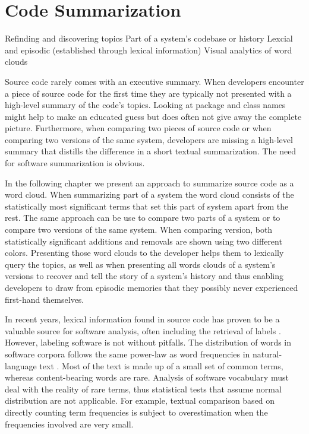 
\chapter{Code Summarization}
\label{the chapter on LogLR}

\infobox
	{Refinding and discovering topics}
	{Part of a system's codebase or history}
	{Lexcial and episodic (established through lexical information)}
	{Visual analytics of word clouds}

Source code rarely comes with an executive summary. When developers encounter a piece of source code for the first time they are typically not presented with a high-level summary of the code's topics. Looking at package and class names might help to make an educated guess but does often not give away the complete picture. Furthermore, when comparing two pieces of source code or when comparing two versions of the same system, developers are missing a high-level summary that distills the difference in a short textual summarization. The need for software summarization is obvious.

In the following chapter we present an approach to summarize source code as a word cloud. When summarizing part of a system the word cloud consists of the statistically most significant terms that set this part of system apart from the rest. The same approach can be use to compare two parts of a system or to compare two versions of the same system. When comparing version, both statistically significant additions and removals are shown using two different colors. Presenting those word clouds to the developer helps them to lexically query the topics, as well as when presenting all words clouds of a system's versions to recover and tell the story of a system's history and thus enabling developers to draw from episodic memories that they possibly never experienced first-hand themselves.

\asteriskasteriskasterisk


In recent years, lexical information found in source code has proven to be a valuable source for software analysis, often including the retrieval of labels \cite{Baldi08OOPSLA,EinarHoest,Kuhn07a}. However, labeling software is not without pitfalls. The distribution of words in software corpora follows the same power-law as word frequencies in natural-language text \cite{Linstead09SUITE}. Most of the text is made up of a small set of common terms, whereas content-bearing words are rare. Analysis of software vocabulary must deal with the reality of rare terms, thus statistical tests that assume normal distribution are not applicable. For example, textual comparison based on directly counting term frequencies is subject to overestimation when the frequencies involved are very small.  

